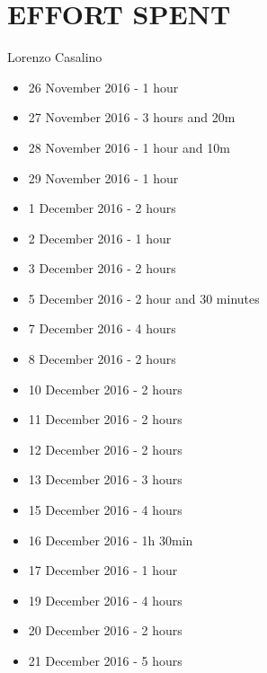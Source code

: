 \section{EFFORT SPENT}

	Lorenzo Casalino

	\begin{itemize}
		\item 26 November 2016 - 1 hour
		\item 27 November 2016 - 3 hours and 20m
		\item 28 November 2016 - 1 hour and 10m
		\item 29 November 2016 - 1 hour
		\item 1  December 2016 - 2 hours
		\item 2  December 2016 - 1 hour
		\item 3  December 2016 - 2 hours
		\item 5  December 2016 - 2 hour and 30 minutes
		\item 7  December 2016 - 4 hours
		\item 8  December 2016 - 2 hours
		\item 10 December 2016 - 2 hours
		\item 11 December 2016 - 2 hours
		\item 12 December 2016 - 2 hours
		\item 13 December 2016 - 3 hours
		\item 15 December 2016 - 4 hours
		\item 16 December 2016 - 1h 30min
		\item 17 December 2016 - 1 hour
		\item 19 December 2016 - 4 hours
		\item 20 December 2016 - 2 hours
		\item 21 December 2016 - 5 hours
	\end{itemize}
